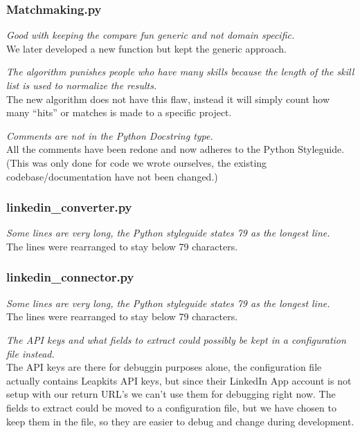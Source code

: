 \subsubsection{Matchmaking.py}
\begin{itemize*}
    \item \textit{Good with keeping the compare fun generic and not domain specific.}\\
          We later developed a new function but kept the generic approach.
    \item \textit{The algorithm punishes people who have many skills because the length of the skill list is used to normalize the results.}\\
          The new algorithm does not have this flaw, instead it will simply count how many ``hits'' or matches is made to a specific project.
    \item \textit{Comments are not in the Python Docstring type.}\\
          All the comments have been redone and now adheres to the Python Styleguide. (This was only done for code we wrote ourselves, the existing codebase/documentation have not been changed.)
\end{itemize*}


\subsubsection{linkedin\_converter.py}
\begin{itemize*}
    \item \textit{Some lines are very long, the Python styleguide states 79 as the longest line.}\\
          The lines were rearranged to stay below 79 characters.
\end{itemize*}

\subsubsection{linkedin\_connector.py}
\begin{itemize*}
    \item \textit{Some lines are very long, the Python styleguide states 79 as the longest line.}\\
          The lines were rearranged to stay below 79 characters.
    \item \textit{The API keys and what fields to extract could possibly be kept in a configuration file instead.}\\
          The API keys are there for debuggin purposes alone, the configuration file actually contains Leapkits API keys, but since their LinkedIn App account is not setup with our return URL's we can't use them for debugging right now.
          The fields to extract could be moved to a configuration file, but we have chosen to keep them in the file, so they are easier to debug and change during development.
\end{itemize*}